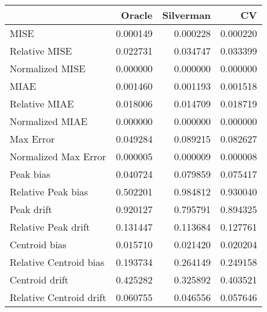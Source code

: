 \begin{tabular}{lrrr}
  \hline
 & Oracle & Silverman & CV \\ 
  \hline
MISE & 0.000149 & 0.000228 & 0.000220 \\ 
  Relative MISE & 0.022731 & 0.034747 & 0.033399 \\ 
  Normalized MISE & 0.000000 & 0.000000 & 0.000000 \\ 
  MIAE & 0.001460 & 0.001193 & 0.001518 \\ 
  Relative MIAE & 0.018006 & 0.014709 & 0.018719 \\ 
  Normalized MIAE & 0.000000 & 0.000000 & 0.000000 \\ 
  Max Error & 0.049284 & 0.089215 & 0.082627 \\ 
  Normalized Max Error & 0.000005 & 0.000009 & 0.000008 \\ 
  Peak bias & 0.040724 & 0.079859 & 0.075417 \\ 
  Relative Peak bias & 0.502201 & 0.984812 & 0.930040 \\ 
  Peak drift & 0.920127 & 0.795791 & 0.894325 \\ 
  Relative Peak drift & 0.131447 & 0.113684 & 0.127761 \\ 
  Centroid bias & 0.015710 & 0.021420 & 0.020204 \\ 
  Relative Centroid bias & 0.193734 & 0.264149 & 0.249158 \\ 
  Centroid drift & 0.425282 & 0.325892 & 0.403521 \\ 
  Relative Centroid drift & 0.060755 & 0.046556 & 0.057646 \\ 
   \hline
\end{tabular}
